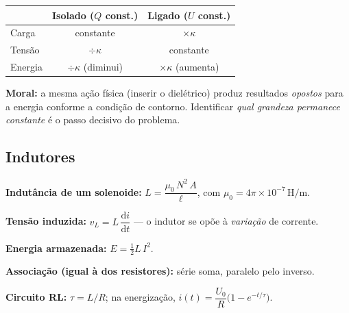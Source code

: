 \begin{questao}[3]{}
{\smallskip
\begin{center}\small\sffamily
\begin{tabular}{@{}l c c@{}}
\toprule
 & \textbf{Isolado ($Q$ const.)} & \textbf{Ligado ($U$ const.)}\\
\midrule
Carga & constante & $\times\kappa$\\
Tensão & $\div\kappa$ & constante\\
Energia & $\div\kappa$ (diminui) & $\times\kappa$ (aumenta)\\
\bottomrule
\end{tabular}
\end{center}
\textbf{Moral:} a mesma ação física (inserir o dielétrico) produz resultados
\emph{opostos} para a energia conforme a condição de contorno. Identificar
\emph{qual grandeza permanece constante} é o passo decisivo do problema.}
\end{questao}



\gabarito[10.1 Capacitores]

\subsection{Indutores}

\begin{conceito}
\textbf{Indutância de um solenoide:}
$L = \dfrac{\mu_0\,N^2\,A}{\ell}$, com
$\mu_0 = 4\pi\times10^{-7}\,\si{\henry\per\meter}$.\par
\textbf{Tensão induzida:} $v_L = L\,\dfrac{\mathrm{d}i}{\mathrm{d}t}$ --- o
indutor se opõe à \emph{variação} de corrente.\par
\textbf{Energia armazenada:} $E = \tfrac12 L\,I^2$.\par
\textbf{Associação (igual à dos resistores):} série soma, paralelo pelo inverso.\par
\textbf{Circuito RL:} $\tau = L/R$; na energização,
$i(t) = \dfrac{U_0}{R}\big(1 - e^{-t/\tau}\big)$.
\end{conceito}

\legendaniveis

\blocofixacao

